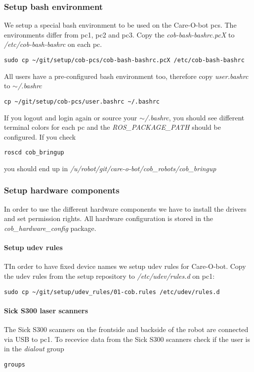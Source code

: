\subsubsection{Setup bash environment}
We setup a special bash environment to be used on the Care-O-bot pcs. The environments differ from pc1, pc2 and pc3. Copy the \textit{cob-bash-bashrc.pcX} to \textit{/etc/cob-bash-bashrc} on each pc.

\begin{lstlisting}
sudo cp ~/git/setup/cob-pcs/cob-bash-bashrc.pcX /etc/cob-bash-bashrc
\end{lstlisting}

All users have a pre-configured bash environment too, therefore copy \textit{user.bashrc} to \textit{$\sim$/.bashrc}
\begin{lstlisting}
cp ~/git/setup/cob-pcs/user.bashrc ~/.bashrc
\end{lstlisting}

If you logout and login again or source your \textit{$\sim$/.bashrc}, you should see different terminal colors for each pc and the \textit{ROS\_PACKAGE\_PATH} should be configured. If you check 
\begin{lstlisting}
roscd cob_bringup
\end{lstlisting}
you should end up in \textit{/u/robot/git/care-o-bot/cob\_robots/cob\_bringup}

\subsubsection{Setup hardware components}
In order to use the different hardware components we have to install the drivers and set permission rights. All hardware configuration is stored in the \textit{cob\_hardware\_config} package.

\paragraph{Setup udev rules}
TIn order to have fixed device names we setup udev rules for Care-O-bot. Copy the udev rules from the setup repository to \textit{/etc/udev/rules.d} on pc1:
\begin{lstlisting}
sudo cp ~/git/setup/udev_rules/01-cob.rules /etc/udev/rules.d
\end{lstlisting}

\paragraph{Sick S300 laser scanners}
The Sick S300 scanners on the frontside and backside of the robot are connected via USB to pc1. To recevice data from the Sick S300 scanners check if the user is in the \textit{dialout} group
\begin{lstlisting}
groups
\end{lstlisting}

